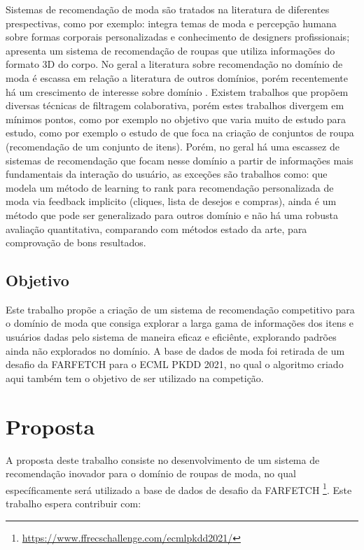 \documentclass{article}
\begin{document}
Sistemas de recomendação de moda são tratados na literatura de diferentes prespectivas, como por exemplo: \citeauthor{wang2014intelligent} integra temas de moda e percepção humana sobre formas corporais personalizadas e conhecimento de designers profissionais; \cite{dong2020interactive} apresenta um sistema de recomendação de roupas que utiliza informações do formato 3D do corpo. No geral a literatura sobre recomendação no domínio de moda é escassa em relação a literatura de outros domínios, porém recentemente há um crescimento de interesse sobre domínio \cite{he2016ups,frejlichowski2016finding,wakita2015fashion,kang2017visually,zeng2013intelligent}. Existem trabalhos que propõem diversas técnicas de filtragem colaborativa, porém estes trabalhos divergem em mínimos pontos, como por exemplo no objetivo que varia muito de estudo para estudo, como por exemplo o estudo de \citeauthor{hu2015collaborative} que foca na criação de conjuntos de roupa (recomendação de um conjunto de itens). Porém, no geral há uma escassez de sistemas de recomendação que focam nesse domínio a partir de informações mais fundamentais da interação do usuário, as exceções são trabalhos como: \citeauthor{nguyen2014learning} que modela um método de learning to rank para recomendação personalizada de moda via feedback implicito (cliques, lista de desejos e compras), ainda é um método que pode ser generalizado para outros domínio e não há uma robusta avaliação quantitativa, comparando com métodos estado da arte, para comprovação de bons resultados.

\subsection{Objetivo}

Este trabalho propõe a criação de um sistema de recomendação competitivo para o domínio de moda que consiga explorar a larga gama de informações dos itens e usuários dadas pelo sistema de maneira eficaz e eficiênte, explorando padrões ainda não explorados no domínio. A base de dados de moda foi retirada de um desafio da FARFETCH para o ECML PKDD 2021, no qual o algoritmo criado aqui também tem o objetivo de ser utilizado na competição.

\section{Proposta}

A proposta deste trabalho consiste no desenvolvimento de um sistema de recomendação inovador para o domínio de roupas de moda, no qual específicamente será utilizado a base de dados de desafio da FARFETCH \footnote{\url{https://www.ffrecschallenge.com/ecmlpkdd2021/}}. Este trabalho espera contribuir com:
\end{document}
